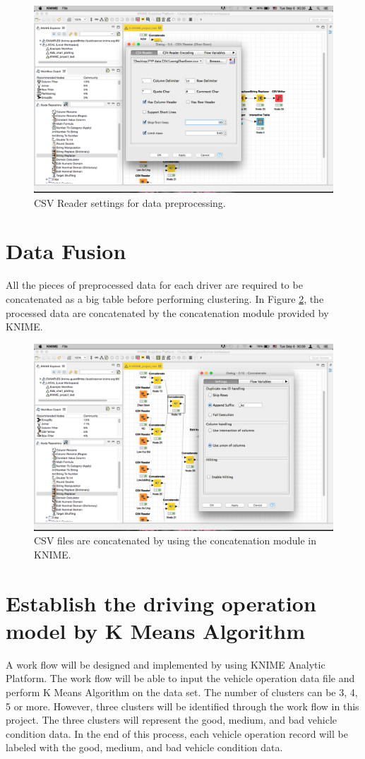 \begin{figure}[hbt!]\centering
\includegraphics[width=.75\textwidth]{image/datapreprocessing}
\caption{CSV Reader settings for data preprocessing.}
\label{fig:preprocess}
\end{figure}

\section{Data Fusion}
All the pieces of preprocessed data for each driver are required to be concatenated as a big table before performing clustering. In Figure \ref{fig:KNIMEfile}, the processed data are concatenated by the concatenation module provided by KNIME.

\begin{figure}[hbt!]\centering
\includegraphics[width=.75\textwidth]{image/KNIMEconcatenate}
\caption{CSV files are concatenated by using the concatenation module in KNIME.}
\label{fig:KNIMEfile}
\end{figure}

\section{Establish the driving operation model by K Means Algorithm}
A work flow will be designed and implemented by using KNIME Analytic Platform. The work flow will be able to input the vehicle operation data file and perform K Means Algorithm on the data set. The number of clusters can be 3, 4, 5 or more. However, three clusters will be identified through the work flow in this project. The three clusters will represent the good, medium, and bad vehicle condition data. In the end of this process, each vehicle operation record will be labeled with the good, medium, and bad vehicle condition data.

